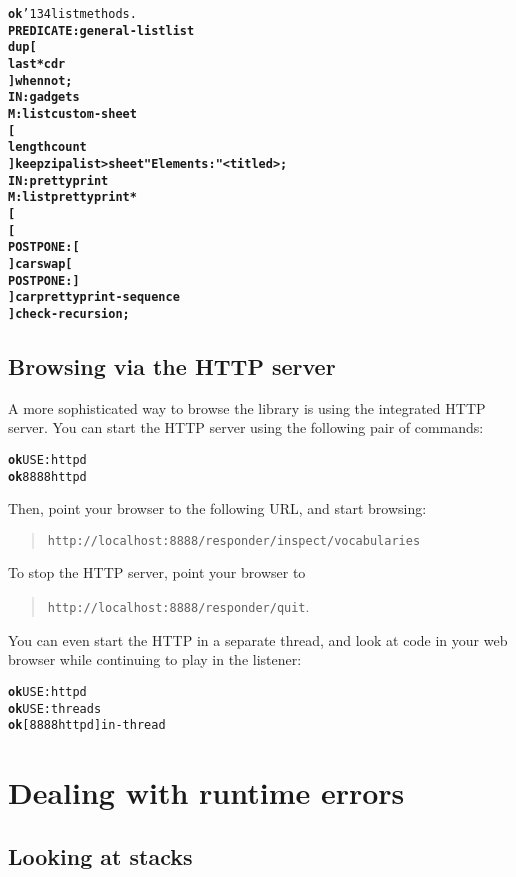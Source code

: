 \documentclass{report}
\newcommand{\bs}{\char'134}
\begin{document}
\begin{alltt}
\textbf{ok} \bs list methods.
\textbf{PREDICATE: general-list list
    dup [
        last* cdr
    ] when not ;
IN: gadgets
M: list custom-sheet
    [
        length count
    ] keep zip alist>sheet "Elements:" <titled> ;
IN: prettyprint
M: list prettyprint*
    [
        [
            POSTPONE: [
        ] car swap [
            POSTPONE: ]
        ] car prettyprint-sequence
    ] check-recursion ;}
\end{alltt}

\subsection{Browsing via the HTTP server}


A more sophisticated way to browse the library is using the integrated HTTP server. You can start the HTTP server using the following pair of commands:

\begin{alltt}
\textbf{ok} USE: httpd
\textbf{ok} 8888 httpd
\end{alltt}

Then, point your browser to the following URL, and start browsing:

\begin{quote}
\texttt{http://localhost:8888/responder/inspect/vocabularies}
\end{quote}

To stop the HTTP server, point your browser to

\begin{quote}
\texttt{http://localhost:8888/responder/quit}.
\end{quote}

You can even start the HTTP in a separate thread, and look at code in your web browser while continuing to play in the listener:

\begin{alltt}
\textbf{ok} USE: httpd
\textbf{ok} USE: threads
\textbf{ok} [ 8888 httpd ] in-thread
\end{alltt}

\section{Dealing with runtime errors}

\subsection{Looking at stacks}
\end{document}
